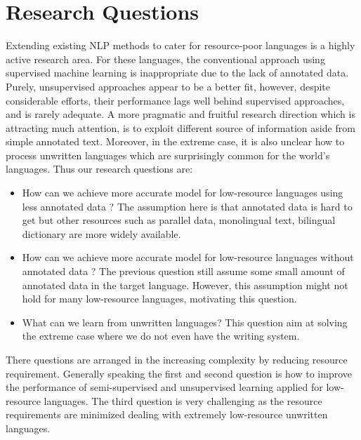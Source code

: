 \documentclass[12pt,twoside,final,hidelinks]{ltthesis}
\theoremstyle{definition}
\begin{document}
\section{Research Questions}
Extending existing NLP methods to cater for resource-poor languages is a highly active research area. For these languages, the conventional approach using supervised machine learning is inappropriate due to the lack of annotated data. Purely, unsupervised approaches appear to be a better fit, however, despite considerable efforts, their performance lags well behind supervised approaches, and is rarely adequate. A more pragmatic and fruitful research direction which is attracting much attention, is to exploit different source of information aside from simple annotated text. Moreover, in the extreme case, it is also unclear how to process unwritten languages which are surprisingly common for the world's languages. Thus our research questions are: 
\begin{itemize}
\item How can we achieve more accurate model for low-resource languages using less annotated data ? The assumption here is that annotated data is hard to get but other resources such as parallel data, monolingual text, bilingual dictionary are more widely available. %
\item How can we achieve more accurate model for low-resource languages without annotated data ? The previous question still assume some small amount of annotated data in the target language. However, this assumption might not hold for many low-resource languages, motivating this question. 

\item What can we learn from unwritten languages? This question aim at solving the extreme case where we do not even have the writing system. 
\end{itemize}
There questions are arranged in the increasing complexity by reducing resource requirement. Generally speaking the first and second question is how to improve
the performance of semi-supervised and unsupervised learning applied for low-resource languages. The third question is very challenging as the resource requirements 
are minimized dealing with extremely low-resource unwritten languages. 
\end{document}
